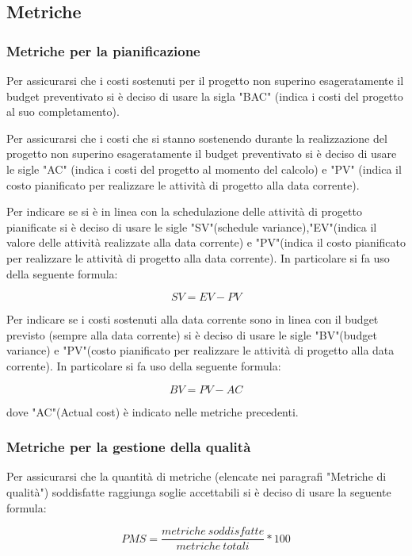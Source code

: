 \subsection{Metriche}
\subsubsection{Metriche per la pianificazione}
Per assicurarsi che i costi sostenuti per il progetto non superino esageratamente il budget preventivato si è deciso di usare la sigla "BAC" (indica i costi del progetto al suo completamento).

Per assicurarsi che i costi che si stanno sostenendo durante la realizzazione del progetto non superino esageratamente il budget preventivato si è deciso di usare le sigle "AC" (indica i costi del progetto al momento del calcolo) e "PV" (indica il costo pianificato per realizzare le attività di progetto alla data corrente).


Per indicare se si è in linea con la schedulazione delle attività di progetto pianificate si è deciso di usare le sigle "SV"(schedule variance),"EV"(indica il valore delle attività realizzate alla data corrente) e "PV"(indica il costo pianificato per realizzare le attività di progetto alla data corrente). In particolare si fa uso della seguente formula:
\begin{center}
\[SV=EV-PV\]
\end{center}

Per indicare se i costi sostenuti alla data corrente sono in linea con il budget previsto (sempre alla data corrente) si è deciso di usare le sigle "BV"(budget variance) e "PV"(costo pianificato per realizzare le attività di progetto alla data corrente).  In particolare si fa uso della seguente formula:
\begin{center}
\[BV=PV-AC\]
\end{center}
dove "AC"(Actual cost) è indicato nelle metriche precedenti.

\subsubsection{Metriche per la gestione della qualità}
Per assicurarsi che la quantità di metriche (elencate nei paragrafi "Metriche di qualità")  soddisfatte raggiunga soglie accettabili si è deciso di usare la seguente formula:
\begin{center}
\[PMS=\frac{metriche \ soddisfatte}{metriche \ totali}*100\]
\end{center}

